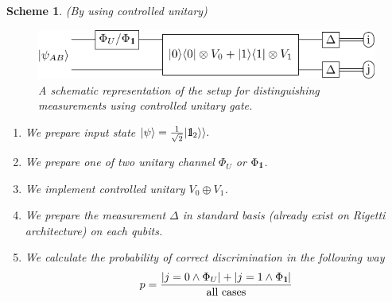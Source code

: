\documentclass[preprint,12pt, a4paper]{elsarticle}
\newcommand{\ket}[1]{\ensuremath{|#1\rangle}}
\newcommand{\1}{{\rm 1\hspace{-0.9mm}l}}
\newcommand{\Id}{{\rm 1\hspace{-0.9mm}l}}
\newcommand{\ee}{\ensuremath{\mathrm{e}}}
\newcommand{\ii}{\ensuremath{\mathrm{i}}}
\newcommand{\PP}{\mathcal{P}}
\newtheorem{scheme}{Scheme}
\begin{document}
\begin{scheme}(By using controlled unitary)
\begin{figure}[h!]
\centering 
\includegraphics[scale=1.2]{pics/controlled_unitary} 

\caption{ A schematic representation of the setup for distinguishing
	measurements using controlled unitary gate. 
}\label{fig:controlled}
\end{figure}
\begin{enumerate}
\item We prepare input state $\ket{\psi} = \frac{1}{\sqrt{2} } | \Id_2 \rangle 
\rangle. $
\item We prepare one of two unitary channel $\Phi_{U} $ or $\Phi_{\1}$. 
\item We implement controlled unitary $V_0 \oplus V_1$.
\item We prepare the measurement $\Delta$ in standard basis (already exist on 
Rigetti architecture) on each qubits.
\item We calculate the probability of correct discrimination in the following 
way
\begin{equation}
p = \frac{|j=0 \wedge \Phi_{U} | + |j=1 \wedge \Phi_{\1}|}{\text{all 
cases}}
\end{equation}
\end{enumerate}
\end{scheme}




\end{document}
